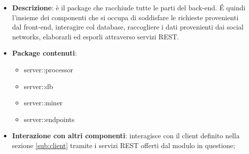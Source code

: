   \begin{itemize}
    \item \textbf{Descrizione}: è il package che racchiude tutte le parti del back-end. \'E quindi l'insieme dei componenti che si occupa di soddisfare le richieste provenienti dal front-end, interagire col database, raccogliere i dati provenienti dai social networks, elaborarli ed esporli attraverso servizi REST.
    \item \textbf{Package contenuti}:
      \begin{itemize}
        \item server::processor
        \item server::db
        \item server::miner
        \item server::endpoints
      \end{itemize}
    \item \textbf{Interazione con altri componenti}: interagisce con il client definito nella sezione \ref{sub:client} tramite i servizi REST offerti dal modulo in questione;
  \end{itemize}

  \pagebreak

   \clearpage \newpage

   \clearpage \newpage

   \clearpage \newpage

   \clearpage \newpage




